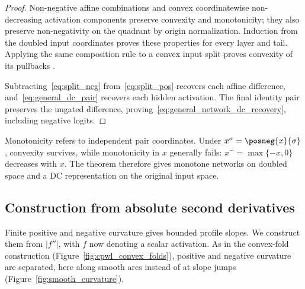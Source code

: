 \begin{proof}
Non-negative affine combinations and convex coordinatewise non-decreasing activation components preserve convexity and monotonicity; they also preserve non-negativity on the quadrant by origin normalization. Induction from the doubled input coordinates proves these properties for every layer and tail. Applying the same composition rule to a convex input split proves convexity of its pullbacks \parencite{Amos2017}.

Subtracting~\eqref{eq:split_neg} from~\eqref{eq:split_pos} recovers each affine difference, and~\eqref{eq:general_dc_pair} recovers each hidden activation. The final identity pair preserves the ungated difference, proving~\eqref{eq:general_network_dc_recovery}, including negative logits.
\end{proof}

Monotonicity refers to independent pair coordinates. Under $x^\sigma=\posneg{x}{\sigma}$, convexity survives, while monotonicity in $x$ generally fails: $x^- =\max\{-x,0\}$ decreases with $x$. The theorem therefore gives monotone networks on doubled space and a DC representation on the original input space.

\subsection{Construction from absolute second derivatives}\label{sec:dc_splitting_smooth}

Finite positive and negative curvature gives bounded profile slopes. We construct them from $|f''|$, with $f$ now denoting a scalar activation. As in the convex-fold construction (Figure~\ref{fig:cpwl_convex_folds}), positive and negative curvature are separated, here along smooth arcs instead of at slope jumps (Figure~\ref{fig:smooth_curvature}).

